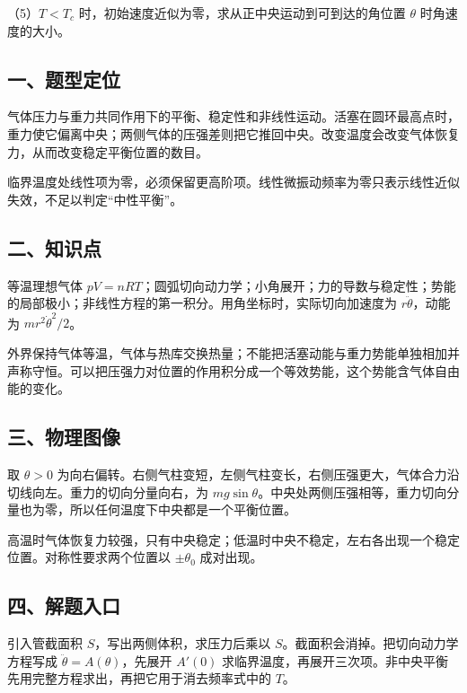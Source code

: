 \documentclass[12pt,a4paper,fontset=fandol]{ctexart}
\begin{document}
（5）\(T<T_c\) 时，初始速度近似为零，求从正中央运动到可到达的角位置
\(\theta\) 时角速度的大小。

\subsection{一、题型定位}\label{ux4e00ux9898ux578bux5b9aux4f4d-1}

气体压力与重力共同作用下的平衡、稳定性和非线性运动。活塞在圆环最高点时，重力使它偏离中央；两侧气体的压强差则把它推回中央。改变温度会改变气体恢复力，从而改变稳定平衡位置的数目。

临界温度处线性项为零，必须保留更高阶项。线性微振动频率为零只表示线性近似失效，不足以判定``中性平衡''。

\subsection{二、知识点}\label{ux4e8cux77e5ux8bc6ux70b9-1}

等温理想气体
\(pV=nRT\)；圆弧切向动力学；小角展开；力的导数与稳定性；势能的局部极小；非线性方程的第一积分。用角坐标时，实际切向加速度为
\(r\ddot\theta\)，动能为 \(mr^2\dot\theta^2/2\)。

外界保持气体等温，气体与热库交换热量；不能把活塞动能与重力势能单独相加并声称守恒。可以把压强力对位置的作用积分成一个等效势能，这个势能含气体自由能的变化。

\subsection{三、物理图像}\label{ux4e09ux7269ux7406ux56feux50cf-1}

取 \(\theta>0\)
为向右偏转。右侧气柱变短，左侧气柱变长，右侧压强更大，气体合力沿切线向左。重力的切向分量向右，为
\(mg\sin\theta\)。中央处两侧压强相等，重力切向分量也为零，所以任何温度下中央都是一个平衡位置。

高温时气体恢复力较强，只有中央稳定；低温时中央不稳定，左右各出现一个稳定位置。对称性要求两个位置以
\(\pm\theta_0\) 成对出现。

\subsection{四、解题入口}\label{ux56dbux89e3ux9898ux5165ux53e3-1}

引入管截面积 \(S\)，写出两侧体积，求压力后乘以
\(S\)。截面积会消掉。把切向动力学方程写成
\(\ddot\theta=A(\theta)\)，先展开 \(A'(0)\)
求临界温度，再展开三次项。非中央平衡先用完整方程求出，再把它用于消去频率式中的
\(T\)。
\end{document}
